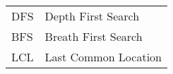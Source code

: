 \begin{longtable}{ll}
DFS & Depth First Search \\
BFS & Breath First Search \\
LCL & Last Common Location \\
\end{longtable}

